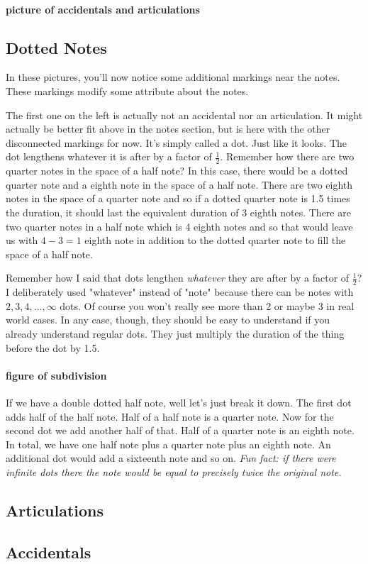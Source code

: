 \documentclass[../OpenAppliedMusicTheory.tex]{subfiles}
\begin{document}
        \paragraph{picture of accidentals and articulations}

        \subsection{Dotted Notes}
        In these pictures, you'll now notice some additional markings near the notes. These markings modify some attribute about the notes. 

        The first one on the left is actually not an accidental nor an articulation. It might actually be better fit above in the notes section, but is here with the other disconnected markings for now. It's simply called a dot. Just like it looks. The dot lengthens whatever it is after by a factor of $\frac{1}{2}$. Remember how there are two quarter notes in the space of a half note? %
        In this case, there would be a dotted quarter note and a eighth note in the space of a half note. There are two eighth notes in the space of a quarter note and so if a dotted quarter note is 1.5 times the duration, it should last the equivalent duration of 3 eighth notes. There are two quarter notes in a half note which is 4 eighth notes and so that would leave us with $4-3=1$ eighth note in addition to the dotted quarter note to fill the space of a half note.

        Remember how I said that dots lengthen \emph{whatever} they are after by a factor of $\frac{1}{2}$? I deliberately used "whatever" instead of "note" because there can be notes with $2, 3, 4, \dots, \infty$ dots. Of course you won't really see more than 2 or maybe 3 in real world cases. In any case, though, they should be easy to understand if you already understand regular dots. They just multiply the duration of the thing before the dot by 1.5. 
        
        \paragraph{figure of subdivision} %

        If we have a double dotted half note, well let's just break it down. The first dot adds half of the half note. Half of a half note is a quarter note. Now for the second dot we add another half of that. Half of a quarter note is an eighth note. In total, we have one half note plus a quarter note plus an eighth note. An additional dot would add a sixteenth note and so on. \emph{Fun fact: if there were infinite dots there the note would be equal to precisely twice the original note.}

        \subsection{Articulations}

        \subsection{Accidentals}
\end{document}

